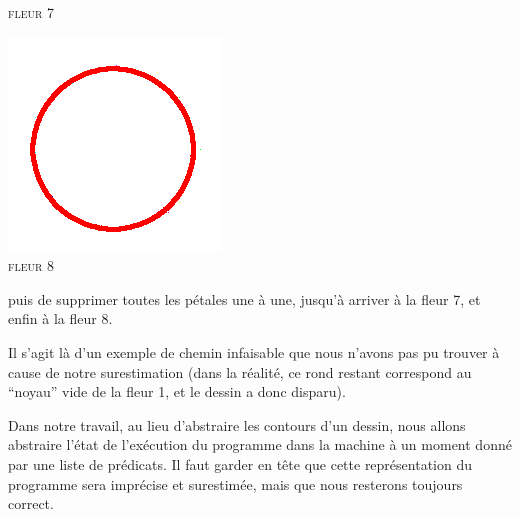 \documentclass[french]{article}
\begin{document}
\begin{center}
\begin{minipage}{.3\textwidth}
\begin{center}
	\textsc{fleur 7}
      \end{center}
    \end{minipage}
    \begin{minipage}{.3\textwidth}
      \begin{center}
	\includegraphics[scale=0.19]{./pictures/flower9.png}\\
	\textsc{fleur 8}
      \end{center}
    \end{minipage}
  \end{center}

  puis de supprimer toutes les pétales une à une, jusqu'à arriver à la fleur 7, et enfin à la fleur 8.

  Il s'agit là d'un exemple de chemin infaisable que nous n'avons pas pu trouver à cause de notre surestimation (dans la réalité, ce rond restant correspond au ``noyau'' vide de la fleur 1, et le dessin a donc disparu).

  \bigbreak

  Dans notre travail, au lieu d'abstraire les contours d'un dessin, nous allons abstraire l'état de l'exécution du programme dans la machine à un moment donné par une liste de prédicats. Il faut garder en tête que cette représentation du programme sera imprécise et surestimée, mais que nous resterons toujours correct.




  \newpage{}
\end{document}
